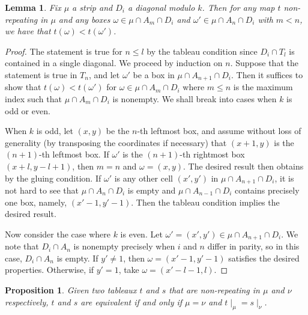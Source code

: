 \documentclass[11pt,reqno]{amsart}
\newcommand*{\restrict}[1]{{\mid}_{#1}}
\theoremstyle{definition}
\theoremstyle{problem}
\theoremstyle{plain}
\newtheorem{proposition}[definition]{Proposition}
\newtheorem{lemma}[definition]{Lemma}
\theoremstyle{remark}
\theoremstyle{theorem}
\numberwithin{equation}{section}
\numberwithin{figure}{section}
\begin{document}
\begin{lemma}\label{lem:19}
  Fix $\mu$ a strip and $D_i$ a diagonal modulo $k$.  Then for any map
  $t$ non-repeating in $\mu$ and any boxes
  $\omega \in \mu \cap A_m \cap D_i$ and
  $\omega' \in \mu \cap A_n \cap D_i$ with $m < n$, we have that
  $t(\omega) < t(\omega')$.
\end{lemma}
\begin{proof}
  The statement is true for $n \leq l$ by the tableau condition since
  $D_i \cap T_l$ is contained in a single diagonal.  We proceed by
  induction on $n$.  Suppose that the statement is true in $T_n$, and
  let $\omega'$ be a box in $\mu \cap A_{n+1} \cap D_i$.  Then it
  suffices to show that $t(\omega) < t(\omega')$ for
  $\omega \in \mu \cap A_m \cap D_i$ where $m \leq n$ is the maximum
  index such that $\mu \cap A_m \cap D_i$ is nonempty. We shall break
  into cases when $k$ is odd or even.

  When $k$ is odd, let $(x,y)$ be the $n$-th leftmost box, and assume
  without loss of generality (by transposing the coordinates if
  necessary) that $(x+1,y)$ is the $(n+1)$-th leftmost box.  If
  $\omega'$ is the $(n+1)$-th rightmost box $(x+l,y-l+1)$, then
  $m = n$ and $\omega = (x,y)$.  The desired result then obtains by
  the gluing condition.  If $\omega'$ is any other cell $(x',y')$ in
  $\mu \cap A_{n+1} \cap D_i$, it is not hard to see that
  $\mu \cap A_n \cap D_i$ is empty and $\mu \cap A_{n-1} \cap D_i$
  contains precisely one box, namely, $(x'-1,y'-1)$.  Then the tableau
  condition implies the desired result.
  
  Now consider the case where $k$ is even.  Let
  $\omega'=(x',y')\in \mu \cap A_{n+1}\cap D_i$.  We note that
  $D_i \cap A_n$ is nonempty precisely when $i$ and $n$ differ in
  parity, so in this case, $D_i \cap A_n$ is empty.  If $y' \neq 1$,
  then $\omega = (x'-1,y'-1)$ satisfies the desired properties.
  Otherwise, if $y' = 1$, take $\omega = (x'-l-1,l)$.
\end{proof}

\begin{proposition}\label{prop:2}
  Given two tableaux $t$ and $s$ that are non-repeating in $\mu$ and
  $\nu$ respectively, $t$ and $s$ are equivalent if and only if
  $\mu=\nu$ and $t\restrict\mu = s\restrict\nu$.
\end{proposition}
\end{document}
